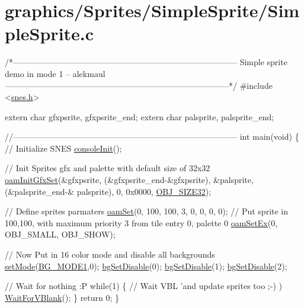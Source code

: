 \hypertarget{a00440}{}\section{graphics/\+Sprites/\+Simple\+Sprite/\+Simple\+Sprite.\+c}

\begin{DoxyCodeInclude}
\textcolor{comment}{/*---------------------------------------------------------------------------------}
\textcolor{comment}{}
\textcolor{comment}{}
\textcolor{comment}{    Simple sprite demo in mode 1}
\textcolor{comment}{    -- alekmaul}
\textcolor{comment}{}
\textcolor{comment}{}
\textcolor{comment}{---------------------------------------------------------------------------------*/}
\textcolor{preprocessor}{#include <\hyperlink{a00386}{snes.h}>}

\textcolor{keyword}{extern} \textcolor{keywordtype}{char} gfxpsrite, gfxpsrite\_end;
\textcolor{keyword}{extern} \textcolor{keywordtype}{char} palsprite, palsprite\_end;

\textcolor{comment}{//---------------------------------------------------------------------------------}
\textcolor{keywordtype}{int} main(\textcolor{keywordtype}{void}) \{
    \textcolor{comment}{// Initialize SNES }
    \hyperlink{a00350_a6047713bb5a73afd3cd1d77e336bcdad}{consoleInit}();
    
    \textcolor{comment}{// Init Sprites gfx and palette with default size of 32x32}
    \hyperlink{a00380_a46e0be47f8fc865a7f43c1b0b126e59a}{oamInitGfxSet}(&gfxpsrite, (&gfxpsrite\_end-&gfxpsrite), &palsprite, (&palsprite\_end-&
      palsprite), 0, 0x0000, \hyperlink{a00380_abc6679a83d9647eac01c3d51ef37151a}{OBJ\_SIZE32});

    \textcolor{comment}{// Define sprites parmaters}
    \hyperlink{a00380_a2f62a591672b786d90ebb03fdf25f159}{oamSet}(0,  100, 100, 3, 0, 0, 0, 0); \textcolor{comment}{// Put sprite in 100,100, with maximum priority 3 from tile
       entry 0, palette 0}
    \hyperlink{a00380_a4120a8ff32c39973babeca3615a0a2fd}{oamSetEx}(0, OBJ\_SMALL, OBJ\_SHOW);
    
    \textcolor{comment}{// Now Put in 16 color mode and disable all backgrounds}
    \hyperlink{a00383_afd9e46ae627d055dd8c98a4b0ebb73b1}{setMode}(\hyperlink{a00347_a05c862edb7f8f75036f10c04dcc3c2a6}{BG\_MODE1},0); \hyperlink{a00347_a4dbfb1b8854ff9ca4a7d11a899281bbb}{bgSetDisable}(0); 
      \hyperlink{a00347_a4dbfb1b8854ff9ca4a7d11a899281bbb}{bgSetDisable}(1); \hyperlink{a00347_a4dbfb1b8854ff9ca4a7d11a899281bbb}{bgSetDisable}(2);
    
    \textcolor{comment}{// Wait for nothing :P}
    \textcolor{keywordflow}{while}(1) \{
        \textcolor{comment}{// Wait VBL 'and update sprites too ;-) )}
        \hyperlink{a00356_a815e2626bd26d0e936d507a363ecd723}{WaitForVBlank}();
    \}
    \textcolor{keywordflow}{return} 0;
\}
\end{DoxyCodeInclude}
 